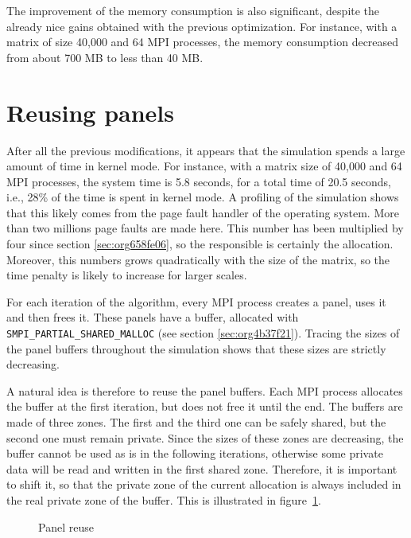 \documentclass[12pt, a4paper]{memoir}
\begin{document}
The improvement of the memory consumption is also significant, despite the already nice gains obtained with the
previous optimization. For instance, with a matrix of size 40,000 and 64 MPI processes, the memory consumption
decreased from about 700 MB to less than 40 MB.
\section{Reusing panels}
\label{sec:orged6bc62}
After all the previous modifications, it appears that the simulation spends a large amount of time in kernel
mode. For instance, with a matrix size of 40,000 and 64 MPI processes, the system time is 5.8 seconds, for a total
time of 20.5 seconds, i.e., 28\% of the time is spent in kernel mode. A profiling of the simulation shows that this
likely comes from the page fault handler of the operating system. More than two millions page faults are made
here. This number has been multiplied by four since section \ref{sec:org658fe06}, so the responsible is
certainly the allocation. Moreover, this numbers grows quadratically with the size of the matrix, so the time penalty
is likely to increase for larger scales.

For each iteration of the algorithm, every MPI process creates a panel, uses it and then frees it. These panels have
a buffer, allocated with \texttt{SMPI\_PARTIAL\_SHARED\_MALLOC} (see section \ref{sec:org4b37f21}). Tracing the sizes of the
panel buffers throughout the simulation shows that these sizes are strictly decreasing.

A natural idea is therefore to reuse the panel buffers. Each MPI process allocates the buffer at the first iteration,
but does not free it until the end. The buffers are made of three zones. The first and the third one can be safely
shared, but the second one must remain private. Since the sizes of these zones are decreasing, the buffer cannot be
used as is in the following iterations, otherwise some private data will be read and written in the first shared
zone. Therefore, it is important to shift it, so that the private zone of the current allocation is always included
in the real private zone of the buffer.  This is illustrated in figure~\ref{fig:panel_reuse}.

\begin{figure}[htbp]
  \centering
  \caption{\label{fig:panel_reuse}Panel reuse}
\end{figure}
\end{document}
